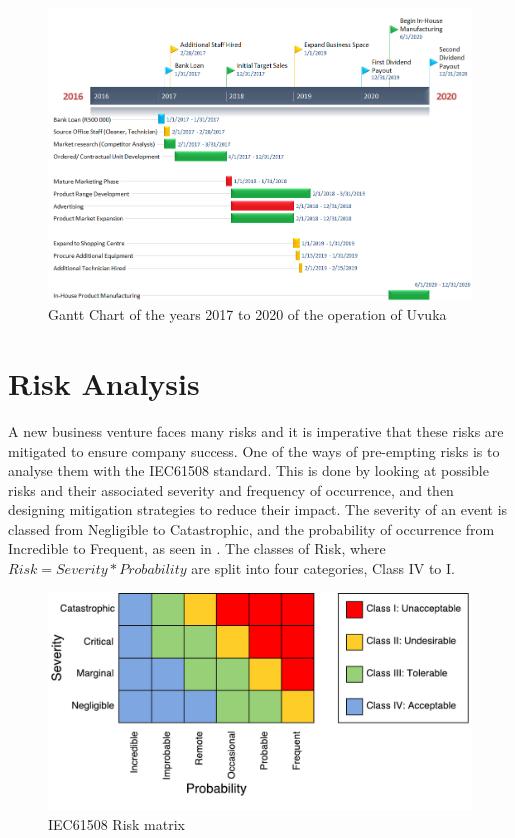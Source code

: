 \begin{figure}[H]
\centering
\includegraphics[width=1\textwidth]{Gantt_2.PNG}
\vskip10pt
\caption[Gantt Chart of the years 2017 to 2020 of the operation of Uvuka]{Gantt Chart of the years 2017 to 2020 of the operation of Uvuka}
\label{fig:Gantt Chart 2}
\end{figure}


\newpage 
\section{Risk Analysis}
A new business venture faces many risks and it is imperative that these risks are mitigated to ensure company success. One of the ways of pre-empting risks is to analyse them with the IEC61508 standard. This is done by looking at possible risks and their associated severity and frequency of occurrence, and then designing mitigation strategies to reduce their impact. The severity of an event is classed from Negligible to Catastrophic, and the probability of occurrence from Incredible to Frequent, as seen in . The classes of Risk, where $Risk = Severity * Probability$ are split into four categories, Class IV to I.

\begin{figure}[H]
\centering
\includegraphics[width=1\textwidth]{images/risktable}
\vskip10pt
\caption{IEC61508 Risk matrix}
\label{fig:risktable}
\end{figure}

